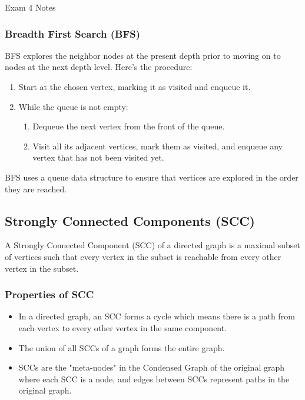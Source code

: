 \begin{examnotes}{Exam 4 Notes}
    \subsubsection*{Breadth First Search (BFS)}
    
    BFS explores the neighbor nodes at the present depth prior to moving on to nodes at the next depth level. Here's the procedure:
    \begin{enumerate}
        \item Start at the chosen vertex, marking it as visited and enqueue it.
        \item While the queue is not empty:
        \begin{enumerate}
            \item Dequeue the next vertex from the front of the queue.
            \item Visit all its adjacent vertices, mark them as visited, and enqueue any vertex that has not been visited yet.
        \end{enumerate}
    \end{enumerate}
    BFS uses a queue data structure to ensure that vertices are explored in the order they are reached.
    
    \subsection*{Strongly Connected Components (SCC)}
    
    A Strongly Connected Component (SCC) of a directed graph is a maximal subset of vertices such that every vertex in the subset is reachable from every other vertex in the subset.
    
    \subsubsection*{Properties of SCC}
    
    \begin{itemize}
        \item In a directed graph, an SCC forms a cycle which means there is a path from each vertex to every other vertex in the same component.
        \item The union of all SCCs of a graph forms the entire graph.
        \item SCCs are the "meta-nodes" in the Condensed Graph of the original graph where each SCC is a node, and edges between SCCs represent paths in the original graph.
    \end{itemize}
    

\end{examnotes}
